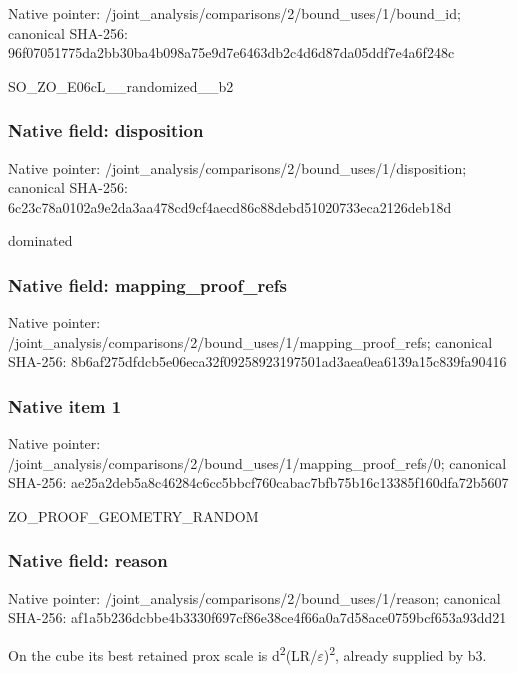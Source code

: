 \documentclass[10pt,a4paper]{article}
\begin{document}
Native pointer: /joint\_analysis/comparis\allowbreak{}ons/2/bound\_uses/1/bound\allowbreak{}\_id; canonical SHA-256: 96f07051775da2bb30ba4b09\allowbreak{}8a75e9d7e6463db2c4d6d87d\allowbreak{}a05ddf7e4a6f248c


SO\_ZO\_E06cL\_\_randomized\_\_b2


\subsubsection{Native field: disposition}


Native pointer: /joint\_analysis/comparis\allowbreak{}ons/2/bound\_uses/1/dispo\allowbreak{}sition; canonical SHA-256: 6c23c78a0102a9e2da3aa478\allowbreak{}cd9cf4aecd86c88debd51020\allowbreak{}733eca2126deb18d


dominated


\subsubsection{Native field: mapping\_proof\_refs}


Native pointer: /joint\_analysis/comparis\allowbreak{}ons/2/bound\_uses/1/mappi\allowbreak{}ng\_proof\_refs; canonical SHA-256: 8b6af275dfdcb5e06eca32f0\allowbreak{}9258923197501ad3aea0ea61\allowbreak{}39a15c839fa90416



\subsubsection{Native item 1}


Native pointer: /joint\_analysis/comparis\allowbreak{}ons/2/bound\_uses/1/mappi\allowbreak{}ng\_proof\_refs/0; canonical SHA-256: ae25a2deb5a8c46284c6cc5b\allowbreak{}bcf760cabac7bfb75b16c133\allowbreak{}85f160dfa72b5607


ZO\_PROOF\_GEOMETRY\_RANDOM


\subsubsection{Native field: reason}


Native pointer: /joint\_analysis/comparis\allowbreak{}ons/2/bound\_uses/1/reaso\allowbreak{}n; canonical SHA-256: af1a5b236dcbbe4b3330f697\allowbreak{}cf86e38ce4f66a0a7d58ace0\allowbreak{}759bcf653a93dd21


On the cube its best retained prox scale is d\textsuperscript{2}(LR/\ensuremath{\varepsilon})\textsuperscript{2}, already supplied by b3.
\end{document}
